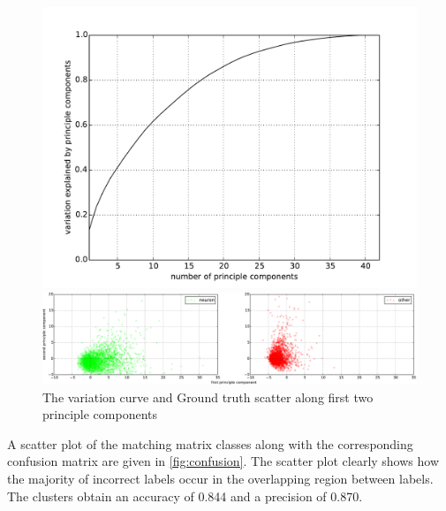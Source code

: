\documentclass[10pt]{article}
\begin{document}
\begin{figure}[h]
    \centering

    \begin{minipage}{0.25\textwidth}
      \centering
      \includegraphics[width=\textwidth]{figs/variation.pdf}
    \end{minipage}
    \begin{minipage}{0.70\textwidth}
      \centering
      \vspace{2mm}
      \includegraphics[width=\textwidth]{figs/PCA_scatter_cropped.pdf}
    \end{minipage}
    \caption{\footnotesize The variation curve and Ground truth scatter along first two principle components}
    \label{fig:variation}
\end{figure}

A scatter plot of the matching matrix classes along with the corresponding confusion matrix are given in \cref{fig:confusion}. The scatter plot clearly shows how the majority of incorrect labels occur in the overlapping region between labels. The clusters obtain an accuracy of \num{0.844} and a precision of \num{0.870}.
\end{document}
